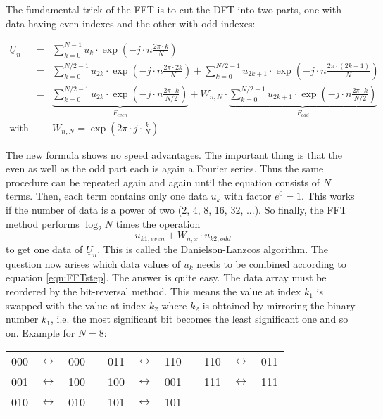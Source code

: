 The fundamental trick of the FFT is to cut the DFT into two parts,
one with data having even indexes and the other with odd indexes:

\begin{eqnarray}
\underline{U}_n & = &
  \sum_{k=0}^{N-1} u_k\cdot \exp\left( -j\cdot n\frac{2\pi\cdot k}{N} \right) \\
  & = & \sum_{k=0}^{N/2-1} u_{2k}\cdot
        \exp\left( -j\cdot n\frac{2\pi\cdot 2k}{N} \right) +
        \sum_{k=0}^{N/2-1} u_{2k+1}\cdot
        \exp\left( -j\cdot n\frac{2\pi\cdot (2k+1)}{N} \right) \\
  & = & \underbrace{ \sum_{k=0}^{N/2-1} u_{2k}\cdot
        \exp\left( -j\cdot n\frac{2\pi\cdot k}{N/2} \right) }_{F_{even}} +
        W_{n,N}\cdot \underbrace{ \sum_{k=0}^{N/2-1} u_{2k+1}\cdot
        \exp\left( -j\cdot n\frac{2\pi\cdot k}{N/2} \right) }_{F_{odd}} \\
\text{with} & & W_{n,N} = \exp\left( 2\pi\cdot j\cdot \frac{k}{N} \right)
\end{eqnarray}

The new formula shows no speed advantages. The important thing is that
the even as well as the odd part each is again a Fourier series. Thus
the same procedure can be repeated again and again until the equation
consists of $N$ terms. Then, each term contains only one data $u_k$
with factor $e^0=1$. This works if the number of data is a power of
two (2, 4, 8, 16, 32, ...).
So finally, the FFT method performs $\log_2 N$ times the operation
\begin{equation}
\label{eqn:FFTstep}
u_{k1,even} + W_{n,x}\cdot u_{k2,odd}
\end{equation}
to get one data of $\underline{U}_n$. This is called the
Danielson-Lanzcos algorithm.
The question now arises which data values of $u_k$
needs to be combined according to equation \ref{eqn:FFTstep}.
The answer is quite easy. The data array must be reordered by the
bit-reversal method. This means the value at index $k_1$ is swapped
with the value at index $k_2$ where $k_2$ is obtained by mirroring
the binary number $k_1$, i.e. the most significant bit becomes the
least significant one and so on. Example for $N=8$:\\

\begin{tabular}{ccccccccccc}
000 & $\leftrightarrow$ & 000  & \qquad\qquad &  011 & $\leftrightarrow$ & 110  & \qquad\qquad &  110 & $\leftrightarrow$ & 011 \\
001 & $\leftrightarrow$ & 100  & \qquad\qquad &  100 & $\leftrightarrow$ & 001  & \qquad\qquad &  111 & $\leftrightarrow$ & 111 \\
010 & $\leftrightarrow$ & 010  & \qquad\qquad &  101 & $\leftrightarrow$ & 101 \\
\end{tabular}\\

